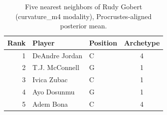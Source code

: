 \begin{table}[htbp]
  \centering\small
  \begin{tabular}{rllc}
    \toprule
    Rank & Player & Position & Archetype \\
    \midrule
    1 & DeAndre Jordan & C & 4 \\
    2 & T.J. McConnell & G & 1 \\
    3 & Ivica Zubac & C & 1 \\
    4 & Ayo Dosunmu & G & 1 \\
    5 & Adem Bona & C & 4 \\
    \bottomrule
  \end{tabular}
  \caption{Five nearest neighbors of Rudy Gobert (curvature_m4 modality), Procrustes-aligned posterior mean.}
  \label{tab:Rudy_Gobert_neighbors_curvature_m4}
\end{table}

